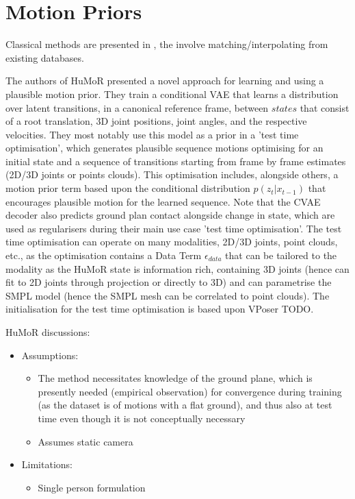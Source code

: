 
\section{Motion Priors}

Classical methods are presented in \cite{DeepPhase}, the involve matching/interpolating from existing databases.

The authors of HuMoR \cite{humor} presented a novel approach for learning and using a plausible motion prior. They train a conditional VAE that learns a distribution over latent transitions, in a canonical reference frame, between $\textit{states}$ that consist of a root translation, 3D joint positions, joint angles, and the respective velocities. They most notably use this model as a prior in a 'test time optimisation', which generates plausible sequence motions optimising for an initial state and a sequence of transitions starting from frame by frame estimates (2D/3D joints or points clouds). This optimisation includes, alongside others, a motion prior term based upon the conditional distribution $p(z_t|x_{t-1})$ that encourages plausible motion for the learned sequence. Note that the CVAE decoder also predicts ground plan contact alongside change in state, which are used as regularisers during their main use case 'test time optimisation'. The test time optimisation can operate on many modalities, 2D/3D joints, point clouds, etc., as the optimisation contains a Data Term $\epsilon_{data}$ that can be tailored to the modality as the HuMoR state is information rich, containing 3D joints (hence can fit to 2D joints through projection or directly to 3D) and can parametrise the SMPL model (hence the SMPL mesh can be correlated to point clouds). The initialisation for the test time optimisation is based upon VPoser TODO. 

HuMoR discussions:
\begin{itemize}
    \item Assumptions:
    \begin{itemize}
        \item The method necessitates knowledge of the ground plane, which is presently needed (empirical observation) for convergence during training (as the dataset is of motions with a flat ground), and thus also at test time even though it is not conceptually necessary
        \item Assumes static camera
    \end{itemize}
    \item Limitations:
    \begin{itemize}
        \item Single person formulation
    \end{itemize}
\end{itemize}

